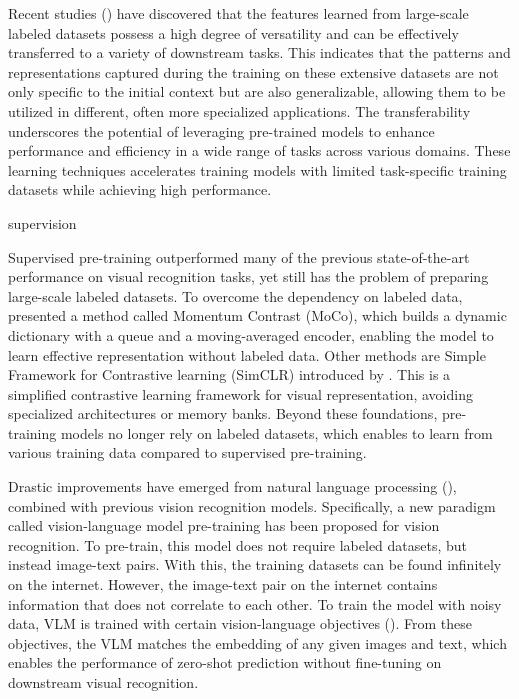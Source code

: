 Recent studies (\cite{radford2021learning}) have discovered that the features learned from large-scale labeled datasets possess a high degree of versatility and can be effectively transferred to a variety of downstream tasks. This indicates that the patterns and representations captured during the training on these extensive datasets are not only specific to the initial context but are also generalizable, allowing them to be utilized in different, often more specialized applications. The transferability underscores the potential of leveraging pre-trained models to enhance performance and efficiency in a wide range of tasks across various domains. 
These learning techniques accelerates training models with limited task-specific training datasets while achieving high performance.

{\color{red}supervision}

Supervised pre-training outperformed many of the previous state-of-the-art performance on visual recognition tasks, yet still has the problem of preparing large-scale labeled datasets. To overcome the dependency on labeled data, \cite{he2020momentumcontrastunsupervisedvisual} presented a method called Momentum Contrast (MoCo), which builds a dynamic dictionary with a queue and a moving-averaged encoder, enabling the model to learn effective representation without labeled data. Other methods are Simple Framework for Contrastive learning (SimCLR) introduced by \cite{chen2020simpleframeworkcontrastivelearning}. This is a simplified contrastive learning framework for visual representation, avoiding specialized architectures or memory banks. Beyond these foundations, pre-training models no longer rely on labeled datasets, which enables to learn from various training data compared to supervised pre-training. 

Drastic improvements have emerged from natural language processing (\cite{devlin2018bert, brown2020language}), combined with previous vision recognition models. Specifically, a new paradigm called vision-language model pre-training has been proposed for vision recognition. To pre-train, this model does not require labeled datasets, but instead image-text pairs. With this, the training datasets can be found infinitely on the internet. However, the image-text pair on the internet contains information that does not correlate to each other. To train the model with noisy data, VLM is trained with certain vision-language objectives (\cite{radford2021learning, yu2022cocacontrastivecaptionersimagetext}). From these objectives, the VLM matches the embedding of any given images and text, which enables the performance of zero-shot prediction without fine-tuning on downstream visual recognition.

